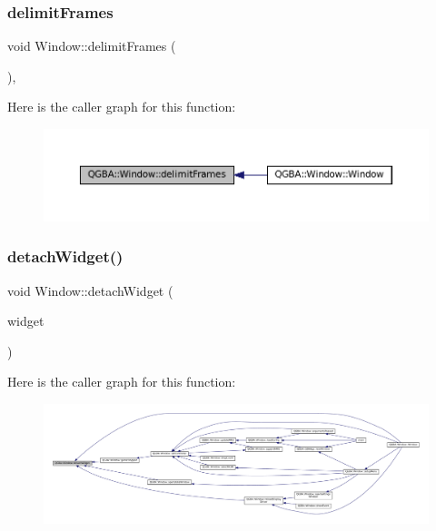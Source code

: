 \subsubsection{\texorpdfstring{delimit\+Frames}{delimitFrames}}
{\footnotesize\ttfamily void Window\+::delimit\+Frames (\begin{DoxyParamCaption}{ }\end{DoxyParamCaption})\hspace{0.3cm}{\ttfamily [private]}, {\ttfamily [slot]}}

Here is the caller graph for this function\+:
\nopagebreak
\begin{figure}[H]
\begin{center}
\leavevmode
\includegraphics[width=350pt]{class_q_g_b_a_1_1_window_ab21ffaf9ea23fa88ba49d691c65af206_icgraph}
\end{center}
\end{figure}
\mbox{\label{class_q_g_b_a_1_1_window_a1bc29e54dc3b7153e30eeeb575dc12fa}} 
\subsubsection{\texorpdfstring{detach\+Widget()}{detachWidget()}}
{\footnotesize\ttfamily void Window\+::detach\+Widget (\begin{DoxyParamCaption}\item[{Q\+Widget $\ast$}]{widget }\end{DoxyParamCaption})\hspace{0.3cm}{\ttfamily [private]}}

Here is the caller graph for this function\+:
\nopagebreak
\begin{figure}[H]
\begin{center}
\leavevmode
\includegraphics[width=350pt]{class_q_g_b_a_1_1_window_a1bc29e54dc3b7153e30eeeb575dc12fa_icgraph}
\end{center}
\end{figure}
\mbox{\label{class_q_g_b_a_1_1_window_a4560a50bc987c8444b86f711d4649e01}} 
